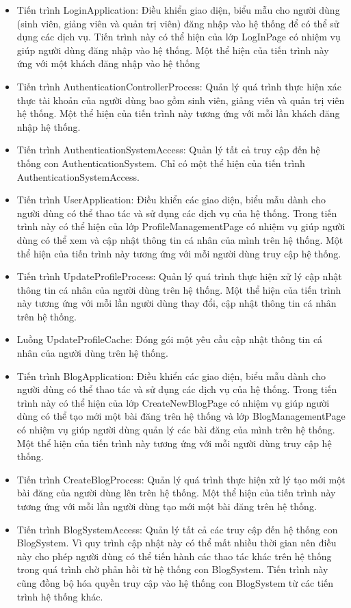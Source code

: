 \documentclass[./../main_file.tex]{subfiles}
\begin{document}
	\begin{itemize}
		\item Tiến trình LoginApplication: Điều khiển giao diện, biểu mẫu cho người dùng (sinh viên, giảng viên và quản trị viên) đăng nhập vào hệ thống để có thể sử dụng các dịch vụ. Tiến trình này có thể hiện của lớp LogInPage có nhiệm vụ giúp người dùng đăng nhập vào hệ thống.
		Một thể hiện của tiến trình này ứng với một khách đăng nhập vào hệ thống
		\item Tiến trình AuthenticationControllerProcess: Quản lý quá trình thực hiện xác thực tài khoản của người dùng bao gồm sinh viên, giảng viên và quản trị viên hệ thống.
		Một thể hiện của tiến trình này tương ứng với mỗi lần khách đăng nhập hệ thống.
		\item Tiến trình AuthenticationSystemAccess: Quản lý tất cả truy cập đến hệ thống con AuthenticationSystem.
		Chỉ có một thể hiện của tiến trình AuthenticationSystemAccess.
		\item Tiến trình UserApplication: Điều khiển các giao diện, biểu mẫu dành cho người dùng có thể thao tác và sử dụng các dịch vụ của hệ thống. Trong tiến trình này có  thể hiện của lớp ProfileManagementPage có nhiệm vụ giúp người dùng có thể xem và cập nhật thông tin cá nhân của mình trên hệ thống.
		Một thể hiện của tiến trình này tương ứng với mỗi người dùng truy cập hệ thống.
		\item Tiến trình UpdateProfileProcess: Quản lý quá trình thực hiện xử lý cập nhật thông tin cá nhân của người dùng trên hệ thống.
		Một thể hiện của tiến trình này tương ứng với mỗi lần người dùng thay đổi, cập nhật thông tin cá nhân trên hệ thống.
		\item Luồng UpdateProfileCache: Đóng gói một yêu cầu cập nhật thông tin cá nhân của người dùng trên hệ thống.
		\item Tiến trình BlogApplication: Điều khiển các giao diện, biểu mẫu dành cho người dùng có thể thao tác và sử dụng các dịch vụ của hệ thống. Trong tiến trình này có thể hiện của lớp CreateNewBlogPage có nhiệm vụ giúp người dùng có thể tạo mới một bài đăng trên hệ thống và lớp BlogManagementPage có nhiệm vụ giúp người dùng quản lý các bài đăng của mình trên hệ thống.
		Một thể hiện của tiến trình này tương ứng với mỗi người dùng truy cập hệ thống.
		\item Tiến trình CreateBlogProcess: Quản lý quá trình thực hiện xử lý tạo mới một bài đăng của người dùng lên trên hệ thống.
		Một thể hiện của tiến trình này tương ứng với mỗi lần người dùng tạo mới một bài đăng trên hệ thống.
		\item Tiến trình BlogSystemAccess: Quản lý tất cả các truy cập đến hệ thống con BlogSystem. Vì quy trình cập nhật này có thể mất nhiều thời gian nên điều này cho phép người dùng có thể tiến hành các thao tác khác trên hệ thống trong quá trình chờ phản hồi từ hệ thống con BlogSystem. Tiến trình này cũng đồng bộ hóa quyền truy cập vào hệ thống con BlogSystem từ các tiến trình hệ thống khác.

\end{itemize}
\end{document}
